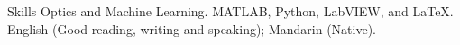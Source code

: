 
\begin{rubric}{Skills}
	Optics and Machine Learning.
	MATLAB, Python, LabVIEW, and \LaTeX.
\entry*[Languages]
	English (Good reading, writing and speaking); Mandarin (Native).
\end{rubric}

